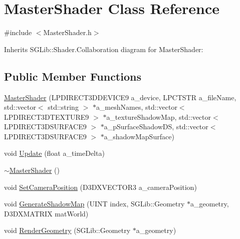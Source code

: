\hypertarget{class_master_shader}{
\section{MasterShader Class Reference}
\label{class_master_shader}
}


{\ttfamily \#include $<$MasterShader.h$>$}

Inherits SGLib::Shader.Collaboration diagram for MasterShader:\subsection*{Public Member Functions}
\begin{DoxyCompactItemize}
\item 
\hyperlink{class_master_shader_a07596b503827f3daff4bff10acad03ac}{MasterShader} (LPDIRECT3DDEVICE9 a\_\-device, LPCTSTR a\_\-fileName, std::vector$<$ std::string $>$ $\ast$a\_\-meshNames, std::vector$<$ LPDIRECT3DTEXTURE9 $>$ $\ast$a\_\-textureShadowMap, std::vector$<$ LPDIRECT3DSURFACE9 $>$ $\ast$a\_\-pSurfaceShadowDS, std::vector$<$ LPDIRECT3DSURFACE9 $>$ $\ast$a\_\-shadowMapSurface)
\item 
void \hyperlink{class_master_shader_acf8849db1f0ac43c2d35bf714ef285ed}{Update} (float a\_\-timeDelta)
\item 
\hyperlink{class_master_shader_af92e2ec718026698de2edcfc4c20948c}{$\sim$MasterShader} ()
\item 
void \hyperlink{class_master_shader_af1125d20e6425a5694700a08ae061d3e}{SetCameraPosition} (D3DXVECTOR3 a\_\-cameraPosition)
\item 
void \hyperlink{class_master_shader_ad80b7842501424ac272a1511e77bf56a}{GenerateShadowMap} (UINT index, SGLib::Geometry $\ast$a\_\-geometry, D3DXMATRIX matWorld)
\item 
void \hyperlink{class_master_shader_a5fc7f7834ff6938c2b55d6af5c97766d}{RenderGeometry} (SGLib::Geometry $\ast$a\_\-geometry)
\end{DoxyCompactItemize}
